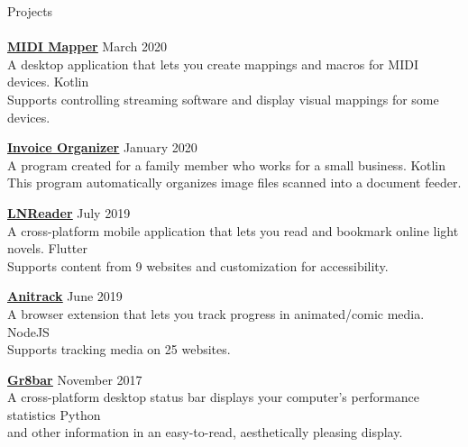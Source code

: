 \documentclass[a4paper]{article}
\newcommand{\lineunder} {
    \vspace*{-8pt} \\
    \hspace*{-18pt} \hrulefill \\
}
\newcommand{\header} [1] {
    {\hspace*{-18pt}\vspace*{6pt} {#1}}
    \vspace*{-6pt} \lineunder
}
\begin{document}
\header{Projects}
{\textbf{\href{https://github.com/TSedlar/MIDI-Mapper}{\ul{MIDI Mapper}}}} \hfill March 2020 \\
\vspace{1mm}
A desktop application that lets you create mappings and macros for MIDI devices. \hfill Kotlin \\ 
Supports controlling streaming software and display visual mappings for some devices. \\
\vspace*{1mm}

{\textbf{\href{https://github.com/TSedlar/InvoiceOrganizer}{\ul{Invoice Organizer}}}} \hfill January 2020 \\
\vspace{1mm}
A program created for a family member who works for a small business. \hfill Kotlin \\ 
This program automatically organizes image files scanned into a document feeder. \\
\vspace*{1mm}

{\textbf{\href{https://sedlar.me/lnreader}{\ul{LNReader}}}} \hfill July 2019 \\
\vspace*{1mm}
A cross-platform mobile application that lets you read and bookmark online light novels. \hfill Flutter \\
Supports content from 9 websites and customization for accessibility.
\vspace*{1mm}

{\textbf{\href{https://github.com/TSedlar/anitrack}{\ul{Anitrack}}}} \hfill June 2019 \\
\vspace*{1mm}
A browser extension that lets you track progress in animated/comic media. \hfill NodeJS \\
Supports tracking media on 25 websites.
\vspace*{1mm}

{\textbf{\href{https://github.com/TSedlar/gr8bar}{\ul{Gr8bar}}}} \hfill November 2017 \\
\vspace*{1mm}
A cross-platform desktop status bar displays your computer's performance statistics \hfill Python \\ and other information in an easy-to-read, aesthetically pleasing display. \\
\vspace*{1mm}

\vspace*{2mm}
\end{document}
